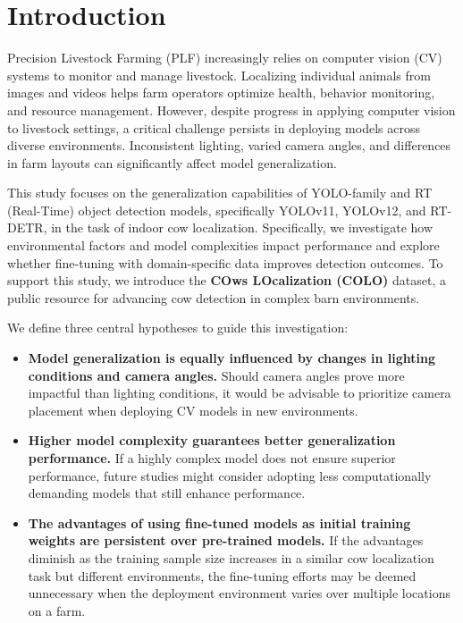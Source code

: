 \section{Introduction}

Precision Livestock Farming (PLF) increasingly relies on computer vision (CV) systems to monitor and manage livestock. Localizing individual animals from images and videos helps farm operators optimize health, behavior monitoring, and resource management. However, despite progress in applying computer vision to livestock settings, a critical challenge persists in deploying models across diverse environments. Inconsistent lighting, varied camera angles, and differences in farm layouts can significantly affect model generalization.

This study focuses on the generalization capabilities of YOLO-family and RT (Real-Time) object detection models, specifically YOLOv11\cite{ultralytics2024yolo11, khanam2024yolov11}, YOLOv12\cite{ultralytics2024yolo12, tian2025yolov12}, and RT-DETR\cite{ultralytics2024detrt, carion2020end}, in the task of indoor cow localization. Specifically, we investigate how environmental factors and model complexities impact performance and explore whether fine-tuning with domain-specific data improves detection outcomes. To support this study, we introduce the \textbf{COws LOcalization (COLO)} dataset, a public resource for advancing cow detection in complex barn environments.

We define three central hypotheses to guide this investigation:

\begin{itemize}
    \item \textbf{Model generalization is equally influenced by changes in lighting conditions and camera angles.} Should camera angles prove more impactful than lighting conditions, it would be advisable to prioritize camera placement when deploying CV models in new environments.
    \item \textbf{Higher model complexity guarantees better generalization performance.} If a highly complex model does not ensure superior performance, future studies might consider adopting less computationally demanding models that still enhance performance.
    \item \textbf{The advantages of using fine-tuned models as initial training weights are persistent over pre-trained models.} If the advantages diminish as the training sample size increases in a similar cow localization task but different environments, the fine-tuning efforts may be deemed unnecessary when the deployment environment varies over multiple locations on a farm.
\end{itemize}

